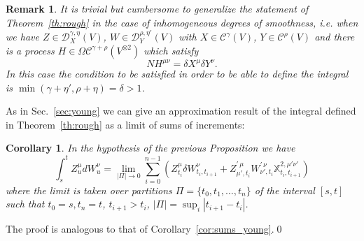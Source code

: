 \documentclass[a4paper,12pt,reqno]{amsproc}
\newcommand{\der}{\delta\!}
\newcommand{\CC}{\mathcal{C}}
\newcommand{\DD}{\mathcal{D}}
\newcommand{\OCC}{\Omega \mathcal{C}}
\newtheorem{corollary}{Corollary}
\newtheorem{remark}{Remark}
\begin{document}
\begin{remark}
It is trivial but cumbersome to generalize the statement of Theorem~\ref{th:rough} in
the case of inhomogeneous degrees of smoothness, i.e. when we have $Z \in \DD_X^{\gamma,\eta}(V)$, $W \in \DD_Y^{\rho,\eta'}(V)$
with $X \in \CC^\gamma(V)$, $Y\in \CC^\rho(V)$ and there is a process $H \in
\OCC^{\gamma+\rho}(V^{\otimes 2})$ which satisfy
$$
N H^{\mu\nu} = \der X^\mu \der Y^\nu.
$$   
In this case the condition to be satisfied in order to be able to
define the integral is $\min(\gamma+\eta',\rho+\eta) = \delta > 1$.  
\end{remark}


As in Sec.~\ref{sec:young} we can give an approximation result of the
integral defined in Theorem~\ref{th:rough} as a limit of sums of increments:
\begin{corollary}
\label{cor:sums_rough}
 In the hypothesis of the previous Proposition we have
\begin{equation*}
\int_s^t Z^\mu_u dW^\nu_u = \lim_{|\Pi|\to 0} \sum_{i=0}^{n-1} \left(Z^\mu_{t_i}
\der W^\nu_{t_{i},t_{i+1}} + Z^{\prime\,\mu}_{\mu',t_i} W^{\prime\,\nu}_{\nu',t_i} \mathbb{X}^{2,\mu'\nu'}_{t_{i},t_{i+1}}\right)    
\end{equation*}
where the limit is taken over  partitions $\Pi = \{t_0,t_1,\dots,t_n\}$ of the interval
$[s,t]$ such that $t_0 = s, t_n = t$, $t_{i+1}>t_i$, $|\Pi| = \sup_i
|t_{i+1}-t_i|$.
\end{corollary}
\proof The proof is analogous to that of Corollary~\ref{cor:sums_young}.\qed

\bigskip
\end{document}
